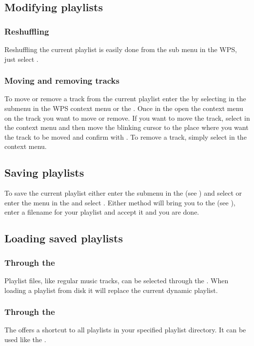 
\subsection{Modifying playlists}
\subsubsection{Reshuffling}
Reshuffling the current playlist is easily done from the 
sub menu in the WPS, just select .

\subsubsection{Moving and removing tracks}
To move or remove a track from the current playlist enter the
 by selecting  in the
 submenu in the WPS context menu or the .
Once in the  open the context menu on the track you
want to move or remove. If you want to move the track, select  in
the context menu and then move the blinking cursor to the place where you want
the track to be moved and confirm with \ActionStdOk. To remove a track, simply
select  in the context menu.

\subsection{Saving playlists}
To save the current playlist either enter the  submenu
in the  (see ) and
select  or enter the
 menu in the  and select
.
Either method will bring you to the  (see
), enter a filename for your playlist and
accept it and you are done.

\subsection{Loading saved playlists}
\subsubsection{Through the }
Playlist files, like regular music tracks, can be selected through the
. When loading a playlist from disk it will replace
the current dynamic playlist.

\subsubsection{Through the }
The  offers a shortcut to all playlists in your
\daps{} specified playlist directory.
It can be used like the .

